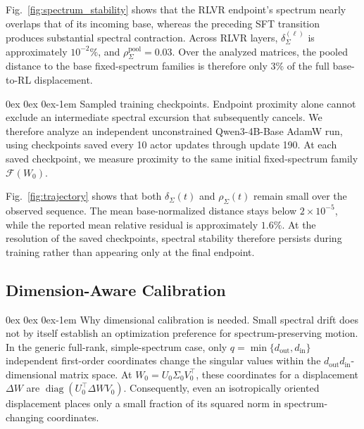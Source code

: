 \documentclass[11pt, a4paper]{utda}
\makeatletter
\renewcommand{\paragraph}{%
  \@startsection{paragraph}{4}%
  {\z@}{0ex \@plus 0ex \@minus 0ex}{-1em}%
  {\normalfont\normalsize\bfseries}%
}
\theoremstyle{plain}
\theoremstyle{definition}
\theoremstyle{remark}
\makeatother
\begin{document}
Fig.~\ref{fig:spectrum_stability} shows that the RLVR endpoint's
spectrum nearly overlaps that of its incoming base, whereas the
preceding SFT transition produces substantial spectral contraction.
Across RLVR layers, $\delta_{\Sigma}^{(\ell)}$ is approximately
$10^{-2}\%$, and $\rho_{\Sigma}^{\mathrm{pool}}=0.03$.
Over the analyzed matrices, the pooled distance to the base
fixed-spectrum families is therefore only $3\%$ of the full
base-to-RL displacement.

\paragraph{Sampled training checkpoints.}
Endpoint proximity alone cannot exclude an intermediate spectral
excursion that subsequently cancels.
We therefore analyze an independent unconstrained Qwen3-4B-Base
AdamW run, using checkpoints saved every 10 actor updates through
update 190.
At each saved checkpoint, we measure proximity to the same
initial fixed-spectrum family $\mathcal F(W_0)$.

Fig.~\ref{fig:trajectory} shows that both
$\delta_\Sigma(t)$ and $\rho_\Sigma(t)$ remain small over the
observed sequence.
The mean base-normalized distance stays below $2\times10^{-5}$, while
the reported mean relative residual is approximately $1.6\%$.
At the resolution of the saved checkpoints, spectral stability
therefore persists during training rather than appearing only
at the final endpoint.




\subsection{Dimension-Aware Calibration}
\label{app:spectral_calibration}

\paragraph{Why dimensional calibration is needed.}
Small spectral drift does not by itself establish an optimization
preference for spectrum-preserving motion.
In the generic full-rank, simple-spectrum case, only
$q=\min\{d_{\mathrm{out}},d_{\mathrm{in}}\}$ independent
first-order coordinates change the singular values within the
$d_{\mathrm{out}}d_{\mathrm{in}}$-dimensional matrix space.
At $W_0=U_0\Sigma_0V_0^\top$, these coordinates for a displacement
$\Delta W$ are
$\operatorname{diag}(U_0^\top\Delta W V_0)$.
Consequently, even an isotropically oriented displacement
places only a small fraction of its squared norm in
spectrum-changing coordinates.
\end{document}
